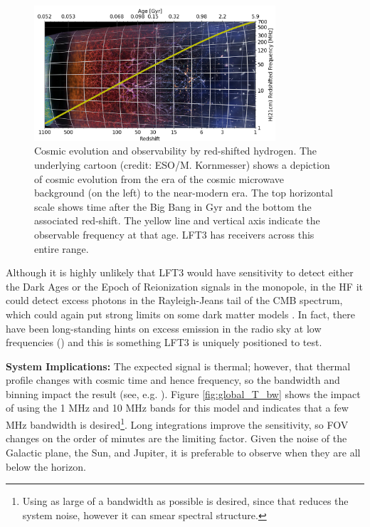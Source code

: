 \begin{figure}
    \centering
    \includegraphics[width=0.8\textwidth]{figures/zage_lft3_python.png}
    \caption{Cosmic evolution and observability by red-shifted hydrogen.  The underlying cartoon (credit: ESO/M. Kornmesser) shows a depiction of cosmic evolution from the era of the cosmic microwave background (on the left) to the near-modern era.  The top horizontal scale shows time after the Big Bang in Gyr and the bottom the associated red-shift.  The yellow line and vertical axis indicate the observable frequency at that age.  LFT3 has receivers across this entire range.}
    \label{fig:cosmo_h}
\end{figure}

Although it is highly unlikely that LFT3 would have sensitivity to detect either the Dark Ages or the Epoch of Reionization signals in the monopole, in the HF it could detect excess photons in the Rayleigh-Jeans tail of the CMB spectrum, which could again put strong limits on some dark matter models \citep{2018PhRvL.121c1103P}. In fact, there have been long-standing hints on excess emission in the radio sky at low frequencies (\cite{2018ApJ...858L...9D,2011ApJ...734....4K}) and this is something LFT3 is uniquely positioned to test. 


\textbf{System Implications:} 
The expected signal is thermal; however, that thermal profile changes with cosmic time and hence frequency, so the bandwidth and binning impact the result (see, e.g. \citealt{2017PASP..129d5001D}).  Figure \ref{fig:global_T_bw} shows the impact of using the 1 MHz and 10 MHz bands for this model and indicates that a few MHz bandwidth is desired\footnote{Using as large of a bandwidth as possible is desired, since that reduces the system noise, however it can smear spectral structure.}.  Long integrations improve the sensitivity, so FOV changes on the order of minutes are the limiting factor.
Given the noise of the Galactic plane, the Sun, and Jupiter, it is preferable to observe when they are all below the horizon.

